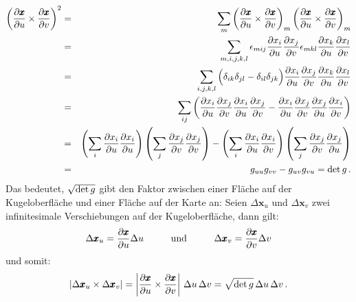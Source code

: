 \begin{eqnarray}
               \left( \frac{\partial \pmb{x}}{\partial u} \times \frac{\partial \pmb{x}}{\partial v} \right)^2 &=&
                 \sum_m  \left( \frac{\partial \pmb{x}}{\partial u} \times \frac{\partial \pmb{x}}{\partial v} \right)_m
                  \left( \frac{\partial \pmb{x}}{\partial u} \times \frac{\partial \pmb{x}}{\partial v} \right)_m \\ 
          &=& \sum_{m,i,j,k,l} \epsilon_{mij} \frac{\partial x_i}{\partial u}\frac{\partial x_j}{\partial v}
                        \epsilon_{mkl} \frac{\partial x_k}{\partial u}\frac{\partial x_l}{\partial v}  \\
          &=& \sum_{i,j,k,l}  \Big( \delta_{ik} \delta_{jl} - \delta_{il} \delta_{jk} \Big) 
            \frac{\partial x_i}{\partial u}\frac{\partial x_j}{\partial v} \frac{\partial x_k}{\partial u}\frac{\partial x_l}{\partial v}  \\ 
          &=& \sum_{ij} \left(  \frac{\partial x_i}{\partial u}\frac{\partial x_j}{\partial v} \frac{\partial x_i}{\partial u}\frac{\partial x_j}{\partial v}     
           -       \frac{\partial x_i}{\partial u}\frac{\partial x_j}{\partial v} \frac{\partial x_j}{\partial u}\frac{\partial x_i}{\partial v} \right) \\
         &=&  \left( \sum_{i}  \frac{\partial x_i}{\partial u} \frac{\partial x_i}{\partial u} \right) 
              \left( \sum_{j}  \frac{\partial x_j}{\partial v} \frac{\partial x_j}{\partial v} \right) - 
              \left(  \sum_{i} \frac{\partial x_i}{\partial u} \frac{\partial x_i}{\partial v} \right)
              \left( \sum_j  \frac{\partial x_j}{\partial v} \frac{\partial x_j}{\partial u} \right)  \\
          &=&  g_{uu} g_{vv} - g_{uv}g_{vu} = {\rm det}\, g   \, .     
\end{eqnarray}
Das bedeutet, $\sqrt{{\rm det}\,g}$ gibt den Faktor zwischen einer Fl\"ache auf der Kugeloberfl\"ache und
einer Fl\"ache auf der Karte an: Seien $\Delta \pmb{x}_u$ und $\Delta \pmb{x}_v$ zwei infinitesimale
Verschiebungen auf der Kugeloberfl\"ache, dann gilt:
\begin{equation}
           \Delta \pmb{x}_u = \frac{\partial \pmb{x}}{\partial u} \Delta u  \hspace{1cm} {\rm und} \hspace{1cm}
           \Delta \pmb{x}_v = \frac{\partial \pmb{x}}{\partial v} \Delta v 
\end{equation} 
und somit:
\begin{equation}
\label{eq_LK_df}
   \left| \Delta \pmb{x}_u \times \Delta \pmb{x}_v \right| 
        = \left| \frac{\partial \pmb{x}}{\partial u} \times \frac{\partial \pmb{x}}{\partial v} \right| \, \Delta u \,\Delta v 
        = \sqrt{{\rm det}\,g} \, \Delta u \, \Delta v \, .
\end{equation} 
